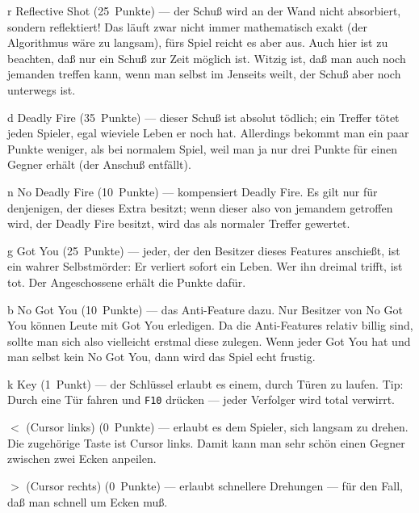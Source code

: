 \documentclass[12pt,twoside]{article}
\newcommand{\deflabel}[1]{\bf #1\hfill}%
\newenvironment{deflist}[1]%
{\begin{list}{}%
{\settowidth{\labelwidth}{\bf #1}%
\setlength{\leftmargin}{\labelwidth}%
\addtolength{\leftmargin}{\labelsep}%
\renewcommand{\makelabel}{\deflabel}}}%
{\end{list}}%
\begin{document}
\begin{deflist}{Win}
\item[r] Reflective Shot (25~Punkte) --- der Schu\ss{} wird an der Wand nicht 
absorbiert, sondern reflektiert! Das l\"auft zwar nicht immer mathematisch 
exakt (der Algorithmus w\"are zu langsam), f\"urs Spiel reicht es aber aus. Auch 
hier ist zu beachten, da\ss{} nur ein Schu\ss{} zur Zeit m\"oglich ist. Witzig ist, 
da\ss{} man auch noch jemanden treffen kann, wenn man selbst im Jenseits weilt, 
der Schu\ss{} aber noch unterwegs ist.


\item[d] Deadly Fire (35~Punkte) --- dieser Schu\ss{} ist absolut t\"odlich; ein 
Treffer t\"otet jeden Spieler, egal wieviele Leben er noch hat. Allerdings 
bekommt man ein paar Punkte weniger, als bei normalem Spiel, weil man ja nur 
drei Punkte f\"ur einen Gegner erh\"alt (der Anschu\ss{} entf\"allt).


\item[n] No Deadly Fire (10~Punkte) --- kompensiert Deadly Fire. Es gilt nur 
f\"ur denjenigen, der dieses Extra besitzt; wenn dieser also von jemandem 
getroffen wird, der Deadly Fire besitzt, wird das als normaler Treffer 
gewertet.


\item[g] Got You (25~Punkte) --- jeder, der den Besitzer dieses Features 
anschie\ss{}t, ist ein wahrer Selbstm\"order: Er verliert sofort ein Leben. Wer 
ihn dreimal trifft, ist tot. Der Angeschossene erh\"alt die Punkte daf\"ur.


\item[b] No Got You (10~Punkte) --- das Anti-Feature dazu. Nur Besitzer von 
No Got You k\"onnen Leute mit Got You erledigen. Da die Anti-Features relativ 
billig sind, sollte man sich also vielleicht erstmal diese zulegen. Wenn 
jeder Got You hat und man selbst kein No Got You, dann wird das Spiel echt 
frustig.


\item[k] Key (1~Punkt) --- der Schl\"ussel erlaubt es einem, durch T\"uren zu 
laufen. Tip: Durch eine T\"ur fahren und \verb|F10| dr\"ucken --- jeder 
Verfolger wird total verwirrt.


\item[$<$] (Cursor links) (0~Punkte) --- erlaubt es dem Spieler, sich 
langsam zu drehen. Die zugeh\"orige Taste ist Cursor links. Damit kann man 
sehr sch\"on einen Gegner zwischen zwei Ecken anpeilen.


\item[$>$] (Cursor rechts) (0~Punkte) --- erlaubt schnellere Drehungen --- 
f\"ur den Fall, da\ss{} man schnell um Ecken mu\ss{}.



\end{deflist}
\end{document}
